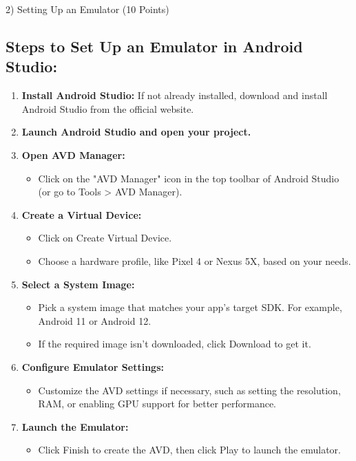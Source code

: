 \documentclass{article}
\begin{document}
2) Setting Up an Emulator (10 Points)\\

\subsection*{Steps to Set Up an Emulator in Android Studio:}

\begin{enumerate}
    \item \textbf{Install Android Studio:} If not already installed, download and install Android Studio from the official website.
    \item \textbf{Launch Android Studio and open your project.}
    \item \textbf{Open AVD Manager:}
    \begin{itemize}
        \item Click on the "AVD Manager" icon in the top toolbar of Android Studio (or go to Tools > AVD Manager).
    \end{itemize}
    \item \textbf{Create a Virtual Device:}
    \begin{itemize}
        \item Click on Create Virtual Device.
        \item Choose a hardware profile, like Pixel 4 or Nexus 5X, based on your needs.
    \end{itemize}
    \item \textbf{Select a System Image:}
    \begin{itemize}
        \item Pick a system image that matches your app's target SDK. For example, Android 11 or Android 12.
        \item If the required image isn't downloaded, click Download to get it.
    \end{itemize}
    \item \textbf{Configure Emulator Settings:}
    \begin{itemize}
        \item Customize the AVD settings if necessary, such as setting the resolution, RAM, or enabling GPU support for better performance.
    \end{itemize}
    \item \textbf{Launch the Emulator:}
    \begin{itemize}
        \item Click Finish to create the AVD, then click Play to launch the emulator.
    \end{itemize}
\end{enumerate}
\end{document}
